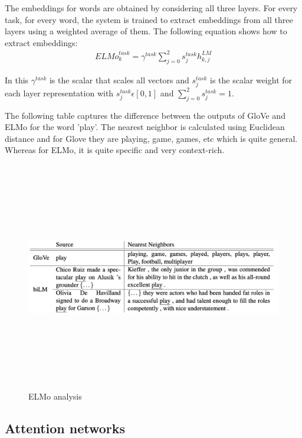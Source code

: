 \documentclass[a4paper, 11pt]{article}
\begin{document}
The embeddings for words are obtained by considering all three layers. For every task, for every word, the system is trained to extract embeddings from all three layers using a weighted average of them. The following equation shows how to extract embeddings:
\begin{align*} 
{ELMo}^{task}_k = \gamma^{task} \sum_{j=0}^{2} s^{task}_j h^{LM}_{k,j}
\end{align*}

In this $\gamma^{task}$ is the scalar that scales all vectors and $s^{task}_j$ is the scalar weight for each layer representation with $s^{task}_j \epsilon [0,1]$ and $\sum_{j=0}^{2} s^{task}_j = 1$. 

The following table captures the difference between the outputs of GloVe and ELMo for the word 'play'. The nearest neighbor is calculated using Euclidean distance and for Glove they are playing, game, games, etc which is quite general. Whereas for ELMo, it is quite specific and very context-rich. 

\begin{figure}[H]
    \centering
    \includegraphics[width=\textwidth,height=10cm,keepaspectratio=true]
    {elmo-2.png}
    \caption{
        ELMo analysis \parencite{GerElmo}
    }
    \label{fig:ELMO2}
\end{figure}
\subsection{Attention networks}

\end{document}
